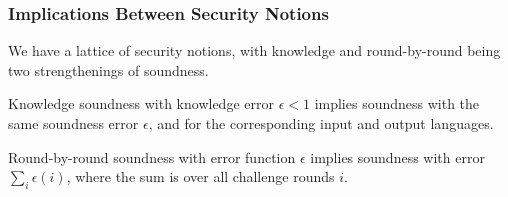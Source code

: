 



\subsubsection{Implications Between Security Notions}

We have a lattice of security notions, with knowledge and round-by-round being two strengthenings of soundness.

\begin{theorem}
    \label{thm:knowledge_soundness_implies_soundness}
    Knowledge soundness with knowledge error $\epsilon < 1$ implies soundness with the same
    soundness error $\epsilon$, and for the corresponding input and output languages.
\end{theorem}

\begin{theorem}
    \label{thm:rbr_soundness_implies_soundness}
    Round-by-round soundness with error function $\epsilon$ implies soundness with error
    $\sum_i \epsilon(i)$, where the sum is over all challenge rounds $i$.
\end{theorem}

